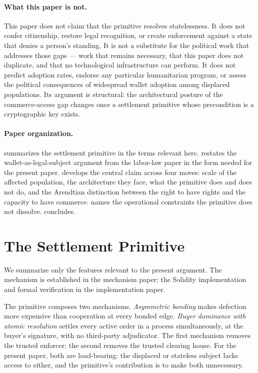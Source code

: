 \documentclass[11pt,a4paper]{article}
\theoremstyle{remark}
\begin{document}
\paragraph{What this paper is not.}
This paper does not claim that the primitive resolves
statelessness. It does not confer citizenship, restore legal
recognition, or create enforcement against a state that denies a
person's standing. It is not a substitute for the political work
that addresses those gaps --- work that remains necessary, that
this paper does not duplicate, and that no technological
infrastructure can perform. It does not predict adoption rates,
endorse any particular humanitarian program, or assess the
political consequences of widespread wallet adoption among
displaced populations. Its argument is structural: the
architectural posture of the commerce-access gap changes once a
settlement primitive whose precondition is a cryptographic key
exists.

\paragraph{Paper organization.}
 summarizes the settlement primitive in the
terms relevant here.  restates the
wallet-as-legal-subject argument from the labor-law paper in
the form needed for the present paper. 
develops the central claim across four moves: scale of the
affected population, the architecture they face, what the
primitive does and does not do, and the Arendtian distinction
between the right to have rights and the capacity to have
commerce.  names the operational constraints
the primitive does not dissolve.  concludes.

\section{The Settlement Primitive}
\label{sec:primitive}

We summarize only the features relevant to the present argument.
The mechanism is established in the mechanism paper; the
Solidity implementation and formal verification
in the implementation paper.

The primitive composes two mechanisms. \emph{Asymmetric bonding}
makes defection more expensive than cooperation at every bonded
edge. \emph{Buyer dominance with atomic resolution} settles every
active order in a process simultaneously, at the buyer's
signature, with no third-party adjudicator. The first mechanism
removes the trusted enforcer; the second removes the trusted
clearing house. For the present paper, both are load-bearing:
the displaced or stateless subject lacks access to either, and
the primitive's contribution is to make both unnecessary.
\end{document}
